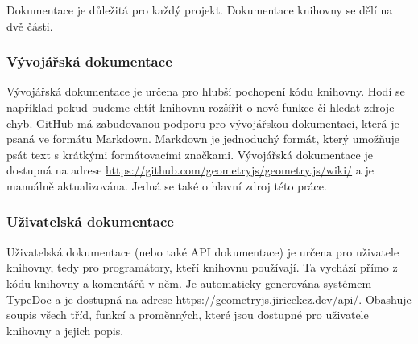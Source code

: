 Dokumentace je důležitá pro každý projekt.
Dokumentace knihovny se dělí na dvě části.

\subsubsection{Vývojářská dokumentace}

Vývojářská dokumentace je určena pro hlubší pochopení kódu knihovny.
Hodí se například pokud budeme chtít knihovnu rozšířit o nové funkce či hledat zdroje chyb.
GitHub má zabudovanou podporu pro vývojářskou dokumentaci, která je psaná ve formátu Markdown.
Markdown je jednoduchý formát, který umožňuje psát text s krátkými formátovacími značkami.
Vývojářská dokumentace je dostupná na adrese \url{https://github.com/geometryjs/geometry.js/wiki/} a je manuálně aktualizována. 
Jedná se také o hlavní zdroj této práce.

\subsubsection{Uživatelská dokumentace}

Uživatelská dokumentace (nebo také API dokumentace) je určena pro uživatele knihovny, tedy pro programátory, kteří knihovnu používají.
Ta vychází přímo z kódu knihovny a komentářů v něm.
Je automaticky generována systémem TypeDoc a je dostupná na adrese \url{https://geometryjs.jiricekcz.dev/api/}.
Obashuje soupis všech tříd, funkcí a proměnných, které jsou dostupné pro uživatele knihovny a jejich popis.
